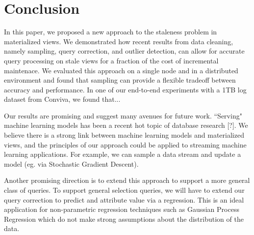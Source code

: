\section{Conclusion}
In this paper, we proposed a new approach to the staleness problem in materialized views.
We demonstrated how recent results from data cleaning, namely sampling, query correction, and outlier detection, can
allow for accurate query processing on stale views for a fraction of the cost of incremental maintenace.
We evaluated this approach on a single node and in a distributed environment and found that sampling can provide a flexible tradeoff 
between accuracy and performance.
In one of our end-to-end experiments with a 1TB log dataset from Conviva, we found that...

Our results are promising and suggest many avenues for future work.
``Serving" machine learning models has been a recent hot topic of database research [?].
We believe there is a strong link between machine learning models and materialized views, and the principles of our approach could be applied
to streaming machine learning applications.
For example, we can sample a data stream and update a model (eg. via Stochastic Gradient Descent).

Another promising direction is to extend this approach to support a more general class of queries.
To support general selection queries, we will have to extend our query correction to predict and attribute value via a regression.
This is an ideal application for non-parametric regression techniques such as Gaussian Process Regression which do
not make strong assumptions about the distribution of the data.


